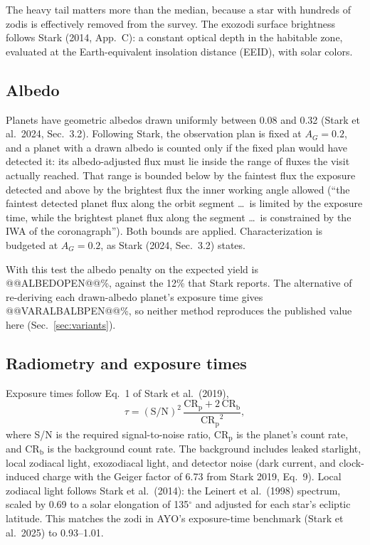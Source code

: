 \documentclass[11pt,a4paper]{article}
\begin{document}
The heavy tail matters more than the median, because a star with hundreds of zodis is effectively
removed from the survey. The exozodi surface brightness follows Stark (2014, App.~C): a constant
optical depth in the habitable zone, evaluated at the Earth-equivalent insolation distance (EEID),
with solar colors.

\subsection{Albedo}
\label{sec:albedo}

Planets have geometric albedos drawn uniformly between 0.08 and 0.32 (Stark et al.\ 2024,
Sec.~3.2). Following Stark, the observation plan is fixed at $A_G = 0.2$, and a planet with a
drawn albedo is counted only if the fixed plan would have detected it: its albedo-adjusted flux
must lie inside the range of fluxes the visit actually reached. That range is bounded below by
the faintest flux the exposure detected and above by the brightest flux the inner working angle
allowed (``the faintest detected planet flux along the orbit segment \ldots\ is limited by the
exposure time, while the brightest planet flux along the segment \ldots\ is constrained by the IWA
of the coronagraph''). Both bounds are applied. Characterization is budgeted at $A_G = 0.2$, as
Stark (2024, Sec.~3.2) states.

With this test the albedo penalty on the expected yield is @@ALBEDOPEN@@\%, against the 12\% that
Stark reports. The alternative of re-deriving each drawn-albedo planet's exposure time gives
@@VARALBALBPEN@@\%, so neither method reproduces the published value here
(Sec.~\ref{sec:variants}).

\subsection{Radiometry and exposure times}
\label{sec:radiometry}

Exposure times follow Eq.~1 of Stark et al.\ (2019),
\begin{equation}
\tau = (\mathrm{S/N})^2\,\frac{\mathrm{CR_p} + 2\,\mathrm{CR_b}}{\mathrm{CR_p}^2},
\end{equation}
where S/N is the required signal-to-noise ratio, $\mathrm{CR_p}$ is the planet's count rate, and
$\mathrm{CR_b}$ is the background count rate. The background includes leaked starlight, local
zodiacal light, exozodiacal light, and detector noise (dark current, and clock-induced charge with
the Geiger factor of 6.73 from Stark 2019, Eq.~9). Local zodiacal light follows Stark et al.\
(2014): the Leinert et al.\ (1998) spectrum, scaled by 0.69 to a solar elongation of 135$^\circ$
and adjusted for each star's ecliptic latitude. This matches the zodi in AYO's exposure-time
benchmark (Stark et al.\ 2025) to 0.93--1.01.
\end{document}
